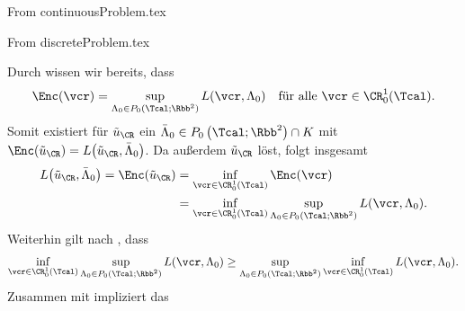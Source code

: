 From continuousProblem.tex


From discreteProblem.tex

  Durch  wissen wir bereits,
  dass 
  \begin{align*}
    \Enc(\vcr) = \sup_{\Lambda_0\in
    P_0\left(\Tcal;\Rbb^2\right)}L(\vcr,\Lambda_0)\quad\text{für alle }
    \vcr\in\CR^1_0(\Tcal).
  \end{align*}
  Somit existiert für $\tilde{u}_\CR$ ein $\bar\Lambda_0\in
  P_0\left(\Tcal;\Rbb^2\right)\cap K$ mit $\Enc\!\left(\tilde{u}_\CR\right) =
  L\!\left(\tilde{u}_\CR,\bar\Lambda_0\right)$. 
  Da außerdem $\tilde{u}_\CR$  löst, folgt insgesamt
  \begin{equation}
    \label{eq:lagrangianEqualsInfSup}
    \begin{aligned}
      L\!\left(\tilde{u}_\CR,\bar\Lambda_0\right)
      =
      \Enc\!\left(\tilde{u}_\CR\right)
      &=
      \inf_{\vcr\in\CR^1_0(\Tcal)}\Enc(\vcr)\\
      &=
      \inf_{\vcr\in\CR^1_0(\Tcal)}
      \sup_{\Lambda_0\in P_0\left(\Tcal;\Rbb^2\right)} L(\vcr,\Lambda_0).
    \end{aligned}
  \end{equation}
  Weiterhin gilt nach \cite[S. 379, Lemma 36.1]{Roc70}, dass
  \begin{align*}
    \inf_{\vcr\in\CR^1_0(\Tcal)}\sup_{\Lambda_0\in P_0\left(\Tcal;\Rbb^2\right)} 
    L(\vcr,\Lambda_0)
    \geq 
    \sup_{\Lambda_0\in P_0\left(\Tcal;\Rbb^2\right)} \inf_{\vcr\in\CR^1_0(\Tcal)} 
    L(\vcr,\Lambda_0).
  \end{align*}
  Zusammen mit  impliziert das
